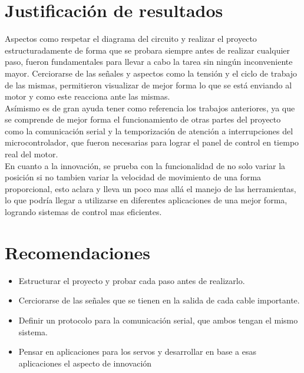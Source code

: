 \documentclass[letterpaper]{article}
\begin{document}
\section{Justificación de resultados}
Aspectos como respetar el diagrama del circuito y realizar el proyecto estructuradamente de forma que se probara siempre antes de realizar cualquier paso, fueron fundamentales para llevar a cabo la tarea sin ningún inconveniente mayor. Cerciorarse de las señales y aspectos como la tensión y el ciclo de trabajo de las mismas, permitieron visualizar de mejor forma lo que se está enviando al motor y como este reacciona ante las mismas.\\
Asímismo es de gran ayuda tener como referencia los trabajos anteriores, ya que se comprende de mejor forma el funcionamiento de otras partes del proyecto como la comunicación serial y la temporización de atención a interrupciones del microcontrolador, que fueron necesarias para lograr el panel de control en tiempo real del motor.
\\
En cuanto a la innovación, se prueba con la funcionalidad de no solo variar la posición si no tambien variar la velocidad de movimiento de una forma proporcional, esto aclara y lleva un poco mas allá el manejo de las herramientas, lo que podría llegar a utilizarse en diferentes aplicaciones de una mejor forma, logrando sistemas de control mas eficientes.
\newpage
\section{Recomendaciones}
\begin{itemize}
\item Estructurar el proyecto y probar cada paso antes de realizarlo.
\item Cerciorarse de las señales que se tienen en la salida de cada cable importante.
\item Definir un protocolo para la comunicación serial, que ambos tengan el mismo sistema.
\item Pensar en aplicaciones para los servos y desarrollar en base a esas aplicaciones el aspecto de innovación
\end{itemize}

 

\end{document}
